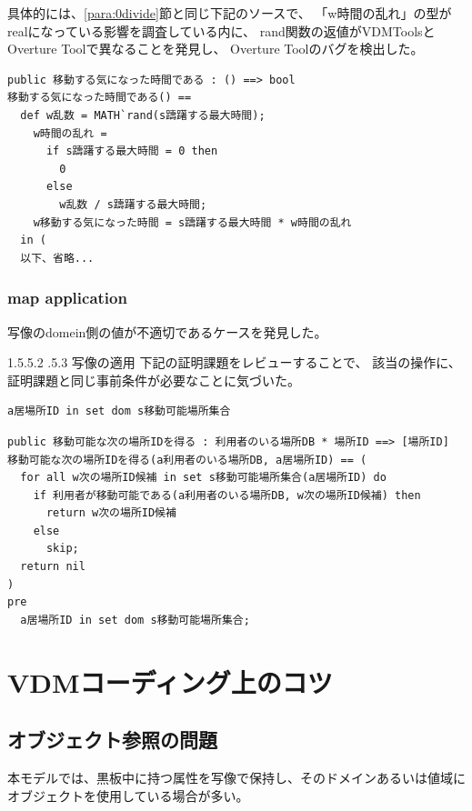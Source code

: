 \documentclass[a4paper,8pt]{jsarticle}
\makeatletter
\renewcommand{\paragraph}{\@startsection{paragraph}{4}{\z@}%
  {1.5\Cvs \@plus.5\Cdp \@minus.2\Cdp}%
  {.5\Cvs \@plus.3\Cdp}%
  {\reset@font\normalsize\bfseries}}
\makeatother
\begin{document}
具体的には、\ref{para:0divide}節と同じ下記のソースで、
「w時間の乱れ」の型がrealになっている影響を調査している内に、
rand関数の返値がVDMToolsとOverture Toolで異なることを発見し、
Overture Toolのバグを検出した。

\begin{verbatim}
public 移動する気になった時間である : () ==> bool
移動する気になった時間である() == 
  def w乱数 = MATH`rand(s躊躇する最大時間);
    w時間の乱れ = 
      if s躊躇する最大時間 = 0 then
        0
      else
        w乱数 / s躊躇する最大時間;
    w移動する気になった時間 = s躊躇する最大時間 * w時間の乱れ
  in (
  以下、省略...
\end{verbatim}

\subsubsection{map application}
写像のdomein側の値が不適切であるケースを発見した。

\paragraph{写像の適用}
下記の証明課題をレビューすることで、
該当の操作に、証明課題と同じ事前条件が必要なことに気づいた。

\begin{verbatim}
a居場所ID in set dom s移動可能場所集合
\end{verbatim}

\begin{verbatim}
public 移動可能な次の場所IDを得る : 利用者のいる場所DB * 場所ID ==> [場所ID]
移動可能な次の場所IDを得る(a利用者のいる場所DB, a居場所ID) == (
  for all w次の場所ID候補 in set s移動可能場所集合(a居場所ID) do
    if 利用者が移動可能である(a利用者のいる場所DB, w次の場所ID候補) then
      return w次の場所ID候補
    else
      skip;
  return nil
)
pre
  a居場所ID in set dom s移動可能場所集合;
\end{verbatim}

\newpage

\section {VDMコーディング上のコツ}
\subsection {オブジェクト参照の問題}
\label{subsec:objref}
本モデルでは、黒板中に持つ属性を写像で保持し、そのドメインあるいは値域にオブジェクトを使用している場合が多い。
\end{document}
